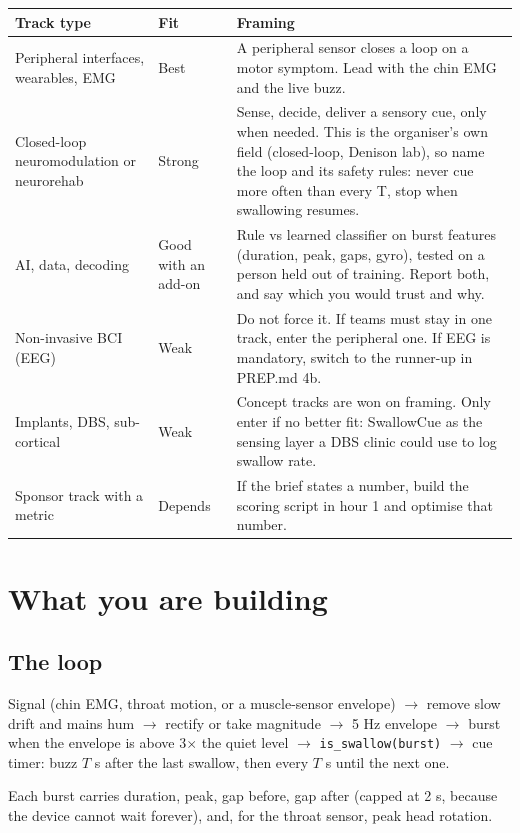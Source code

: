 \documentclass[10.5pt,a4paper]{article}
\newcommand{\f}[1]{\texttt{#1}}
\begin{document}
\begin{tabularx}{\linewidth}{@{}p{3.7cm}p{2.3cm}L@{}}
\toprule
Track type & Fit & Framing\\
\midrule
Peripheral interfaces, wearables, EMG & Best & A peripheral sensor closes a loop on a motor symptom. Lead with the chin EMG and the live buzz.\\
Closed-loop neuromodulation or neurorehab & Strong & Sense, decide, deliver a sensory cue, only when needed. This is the organiser's own field (closed-loop, Denison lab), so name the loop and its safety rules: never cue more often than every T, stop when swallowing resumes.\\
AI, data, decoding & Good with an add-on & Rule vs learned classifier on burst features (duration, peak, gaps, gyro), tested on a person held out of training. Report both, and say which you would trust and why.\\
Non-invasive BCI (EEG) & Weak & Do not force it. If teams must stay in one track, enter the peripheral one. If EEG is mandatory, switch to the runner-up in PREP.md 4b.\\
Implants, DBS, sub-cortical & Weak & Concept tracks are won on framing. Only enter if no better fit: SwallowCue as the sensing layer a DBS clinic could use to log swallow rate.\\
Sponsor track with a metric & Depends & If the brief states a number, build the scoring script in hour 1 and optimise that number.\\
\bottomrule
\end{tabularx}

\section{What you are building}
\subsection{The loop}
Signal (chin EMG, throat motion, or a muscle-sensor envelope) \(\rightarrow\) remove slow drift and mains hum \(\rightarrow\) rectify or take magnitude \(\rightarrow\) 5 Hz envelope \(\rightarrow\) burst when the envelope is above 3\(\times\) the quiet level \(\rightarrow\) \f{is\_swallow(burst)} \(\rightarrow\) cue timer: buzz \(T\) s after the last swallow, then every \(T\) s until the next one.

Each burst carries duration, peak, gap before, gap after (capped at 2 s, because the device cannot wait forever), and, for the throat sensor, peak head rotation.
\end{document}
